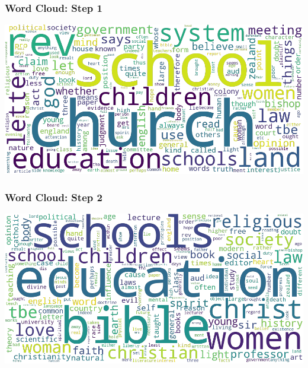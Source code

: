 \documentclass[10pt, compress]{beamer}
\begin{document}
\begin{frame}
	\frametitle{Word Cloud: Step 1}
	\begin{center}
		\includegraphics[width=\textwidth]{images/nb1_philoso_tf-idf.png}
	\end{center}
\end{frame}

\begin{frame}
	\frametitle{Word Cloud: Step 2}
	\begin{center}
		\includegraphics[width=\textwidth]{images/nb2_v2_philoso_tf-idf.png}
	\end{center}
\end{frame}
\end{document}
